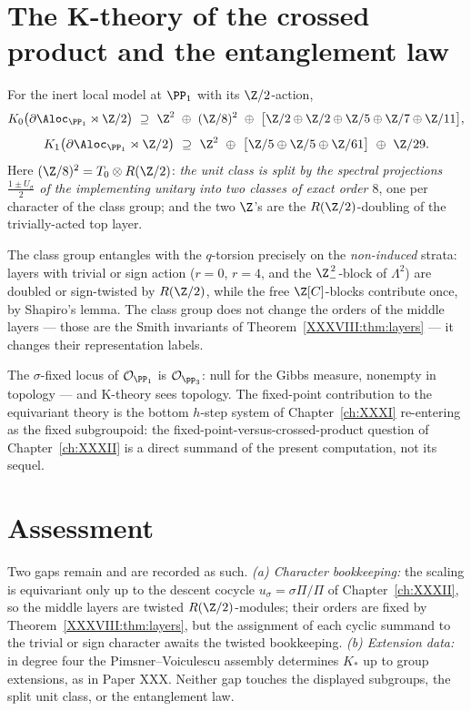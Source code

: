 \section{The K-theory of the crossed product and the entanglement law}\label{XXXVIII:sec:ktheory}

\begin{theorem}\label{XXXVIII:thm:main}
For the inert local model at $\PP_1$ with its $\Z/2$-action,
\[
K_0\bigl(\partial\Aloc_{\PP_1}\rtimes\Z/2\bigr)\ \supseteq\
\Z^2\ \oplus\ (\Z/8)^2\ \oplus\
\bigl[\Z/2\oplus\Z/2\oplus\Z/5\oplus\Z/7\oplus\Z/11\bigr],
\]
\[
K_1\bigl(\partial\Aloc_{\PP_1}\rtimes\Z/2\bigr)\ \supseteq\
\Z^2\ \oplus\ \bigl[\Z/5\oplus\Z/5\oplus\Z/61\bigr]\ \oplus\ \Z/29 .
\]
Here $(\Z/8)^2=T_0\otimes R(\Z/2)$: \emph{the unit class is split by the spectral
projections $\tfrac{1\pm U_\sigma}2$ of the implementing unitary into two classes of
exact order $8$}, one per character of the class group; and the two $\Z$'s are the
$R(\Z/2)$-doubling of the trivially-acted top layer.
\end{theorem}

\begin{remark}[The entanglement law]\label{XXXVIII:rem:law}
The class group entangles with the $q$-torsion precisely on the \emph{non-induced}
strata: layers with trivial or sign action ($r=0$, $r=4$, and the $\Z_-^{\,2}$-block of
$\Lambda^2$) are doubled or sign-twisted by $R(\Z/2)$, while the free $\Z[C]$-blocks
contribute once, by Shapiro's lemma. The class group does not change the orders of the
middle layers --- those are the Smith invariants of Theorem~\ref{XXXVIII:thm:layers} --- it
changes their representation labels.
\end{remark}

\begin{remark}\label{XXXVIII:rem:fixed}
The $\sigma$-fixed locus of $\mathcal O_{\PP_1}$ is $\mathcal O_{\pp_3}$: null for the
Gibbs measure, nonempty in topology --- and K-theory sees topology. The fixed-point
contribution to the equivariant theory is the bottom $h$-step system of Chapter~\ref{ch:XXXI}
re-entering as the fixed subgroupoid: the fixed-point-versus-crossed-product question of
Chapter~\ref{ch:XXXII} is a direct summand of the present computation, not its sequel.
\end{remark}

\section{Assessment}\label{XXXVIII:sec:assessment}

Two gaps remain and are recorded as such. \emph{(a) Character bookkeeping:} the scaling
is equivariant only up to the descent cocycle $u_\sigma=\sigma\Pi/\Pi$ of Chapter~\ref{ch:XXXII},
so the middle layers are twisted $R(\Z/2)$-modules; their orders are fixed by
Theorem~\ref{XXXVIII:thm:layers}, but the assignment of each cyclic summand to the trivial or
sign character awaits the twisted bookkeeping. \emph{(b) Extension data:} in degree four
the Pimsner--Voiculescu assembly determines $K_*$ up to group extensions, as in Paper
XXX. Neither gap touches the displayed subgroups, the split unit class, or the
entanglement law.

